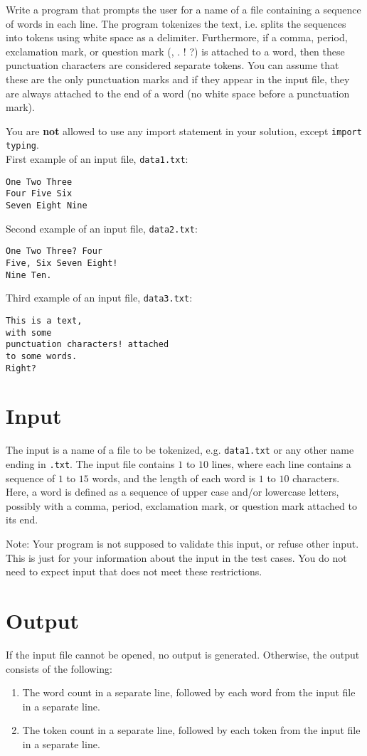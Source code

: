 
Write a program that prompts the user for a name of a file containing a sequence of words in each line.
The program tokenizes the text, i.e. splits the sequences into tokens using white space as a delimiter.
Furthermore, if a comma, period, exclamation mark, or question mark (, . ! ?) is attached to  a word, then these punctuation characters are considered separate tokens.
You can assume that these are the only punctuation marks and if they appear in the input file, they are always attached to the end of a word (no white space before a punctuation mark).

You are \textbf{not} allowed to use any import statement in your solution, except \texttt{import typing}. \\

First example of an input file, \texttt{data1.txt}:
\begin{verbatim}
One Two Three
Four Five Six
Seven Eight Nine
\end{verbatim}

Second example of an input file, \texttt{data2.txt}:
\begin{verbatim}
One Two Three? Four
Five, Six Seven Eight!
Nine Ten.
\end{verbatim}

Third example of an input file, \texttt{data3.txt}:
\begin{verbatim}
This is a text, 
with some
punctuation characters! attached 
to some words. 
Right?
\end{verbatim}

\section*{Input}
The input is a name of a file to be tokenized, e.g. \texttt{data1.txt} or any other name ending in \texttt{.txt}.
The input file contains $1$ to $10$ lines, where each line contains a sequence of $1$ to $15$ words, and the length of each word is $1$ to $10$ characters.
Here, a word is defined as a sequence of upper case and/or lowercase letters, possibly with a comma, period, exclamation mark, or question mark attached to its end.

Note: Your program is not supposed to validate this input, or refuse other input.
This is just for your information about the input in the test cases. 
You do not need to expect input that does not meet these restrictions.

\section*{Output}
If the input file cannot be opened, no output is generated. 
Otherwise, the output consists of the following:
\begin{enumerate}
    \item The word count in a separate line, followed by each word from the input file in a separate line.
    \item The token count in a separate line, followed by each token from the input file in a separate line.
\end{enumerate}
